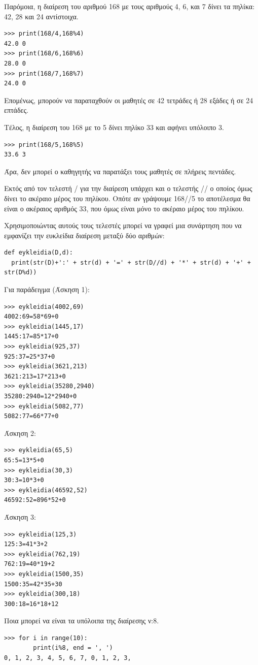 Παρόμοια, η διαίρεση του αριθμού 168 με τους αριθμούς 4, 6, και 7 δίνει τα πηλίκα: 42, 28 και 24 αντίστοιχα. 
\begin{lstlisting}
>>> print(168/4,168%4)
42.0 0
>>> print(168/6,168%6)
28.0 0
>>> print(168/7,168%7)
24.0 0
\end{lstlisting}
Επομένως, μπορούν να παραταχθούν οι μαθητές σε 42 τετράδες ή 28 εξάδες ή σε 24 επτάδες. 

Τέλος, η διαίρεση του 168 με το 5 δίνει πηλίκο 33 και αφήνει υπόλοιπο 3. 
\begin{lstlisting}
>>> print(168/5,168%5)
33.6 3
\end{lstlisting}
Άρα, δεν μπορεί ο καθηγητής να παρατάξει τους μαθητές σε πλήρεις πεντάδες.

Εκτός από τον τελεστή / για την διαίρεση υπάρχει και ο τελεστής // ο οποίος όμως δίνει το ακέραιο μέρος του πηλίκου. Οπότε αν γράψουμε 168//5 το αποτέλεσμα θα είναι ο ακέραιος αριθμός 33, που όμως είναι μόνο το ακέραιο μέρος του πηλίκου.

Χρησιμοποιώντας αυτούς τους τελεστές μπορεί να γραφεί μια συνάρτηση που να εμφανίζει την ευκλείδια διαίρεση μεταξύ δύο αριθμών:
\begin{lstlisting}
def eykleidia(D,d):
  print(str(D)+':' + str(d) + '=' + str(D//d) + '*' + str(d) + '+' + str(D%d))
\end{lstlisting}
Για παράδειγμα (Άσκηση 1):
\begin{lstlisting}
>>> eykleidia(4002,69)
4002:69=58*69+0
>>> eykleidia(1445,17)
1445:17=85*17+0
>>> eykleidia(925,37)
925:37=25*37+0
>>> eykleidia(3621,213)
3621:213=17*213+0
>>> eykleidia(35280,2940)
35280:2940=12*2940+0
>>> eykleidia(5082,77)
5082:77=66*77+0
\end{lstlisting}

Άσκηση 2:
\begin{lstlisting}
>>> eykleidia(65,5)
65:5=13*5+0
>>> eykleidia(30,3)
30:3=10*3+0
>>> eykleidia(46592,52)
46592:52=896*52+0
\end{lstlisting}
Άσκηση 3:
\begin{lstlisting}
>>> eykleidia(125,3)
125:3=41*3+2
>>> eykleidia(762,19)
762:19=40*19+2
>>> eykleidia(1500,35)
1500:35=42*35+30
>>> eykleidia(300,18)
300:18=16*18+12
\end{lstlisting}

\begin{exercise} Ποια μπορεί να είναι τα υπόλοιπα της διαίρεσης ν:8. \end{exercise}

\begin{lstlisting}
>>> for i in range(10):
        print(i%8, end = ', ')
0, 1, 2, 3, 4, 5, 6, 7, 0, 1, 2, 3, 
\end{lstlisting}

